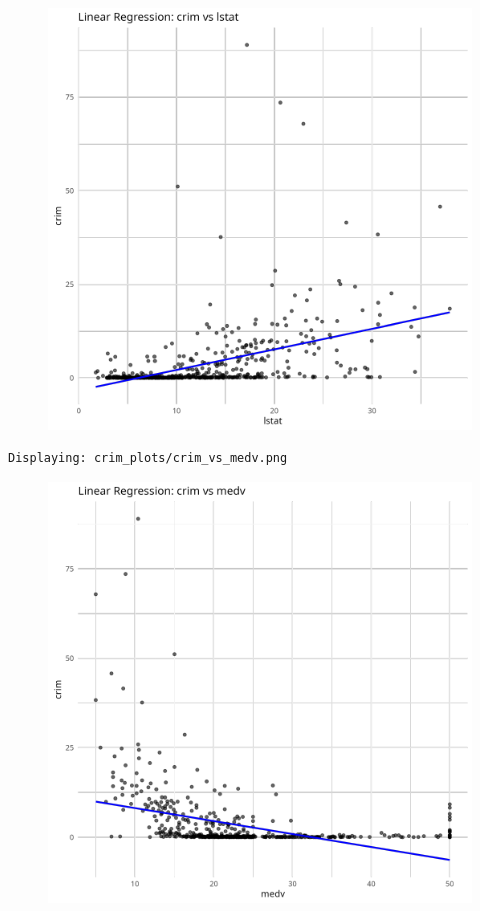 \documentclass[
]{article}
\begin{document}
\begin{figure}[H]

{\centering \includegraphics{hw1_files/figure-pdf/unnamed-chunk-16-5.pdf}

}

\end{figure}

\begin{verbatim}
Displaying: crim_plots/crim_vs_medv.png 
\end{verbatim}

\begin{figure}[H]

{\centering \includegraphics{hw1_files/figure-pdf/unnamed-chunk-16-6.pdf}

}

\end{figure}
\end{document}
